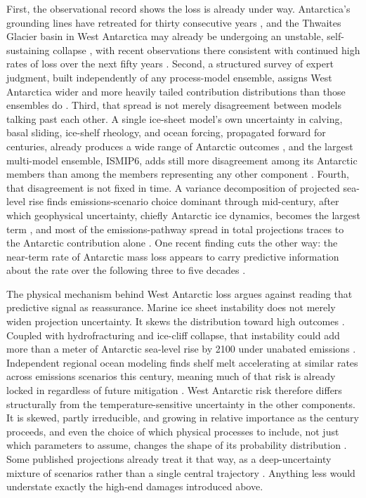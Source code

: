 \documentclass[12pt]{article}
\begin{document}
First, the observational record shows the loss is already under way.
Antarctica's grounding lines have retreated for thirty consecutive years
\citep{Rignot2026}, and the Thwaites Glacier basin in West Antarctica
may already be undergoing an unstable, self-sustaining collapse
\citep{Joughin2014}, with recent observations there consistent with
continued high rates of loss over the next fifty years
\citep{Goldberg2026}. Second, a structured survey of expert judgment,
built independently of any process-model ensemble, assigns West
Antarctica wider and more heavily tailed contribution distributions than
those ensembles do \citep{Bamber2019}. Third, that spread is not merely
disagreement between models talking past each other. A single ice-sheet
model's own uncertainty in calving, basal sliding, ice-shelf rheology,
and ocean forcing, propagated forward for centuries, already produces a
wide range of Antarctic outcomes \citep{Bulthuis2019}, and the largest
multi-model ensemble, ISMIP6, adds still more disagreement among its
Antarctic members than among the members representing any other
component \citep{Seroussi2020}. Fourth, that disagreement is not fixed
in time. A variance decomposition of projected sea-level rise finds
emissions-scenario choice dominant through mid-century, after which
geophysical uncertainty, chiefly Antarctic ice dynamics, becomes the
largest term \citep{Darnell2025}, and most of the emissions-pathway
spread in total projections traces to the Antarctic contribution alone
\citep{DeConto2021}. One recent finding cuts the other way: the
near-term rate of Antarctic mass loss appears to carry predictive
information about the rate over the following three to five decades
\citep{McCormack2026}.

The physical mechanism behind West Antarctic loss argues against
reading that predictive signal as reassurance. Marine ice sheet
instability does not merely widen projection uncertainty. It skews the
distribution toward high outcomes \citep{Robel2019}. Coupled with
hydrofracturing and ice-cliff collapse, that instability could add more
than a meter of Antarctic sea-level rise by 2100 under unabated
emissions \citep{DeContoP2016}. Independent regional ocean modeling
finds shelf melt accelerating at similar rates across emissions
scenarios this century, meaning much of that risk is already locked in
regardless of future mitigation \citep{Naughten2023}. West Antarctic
risk therefore differs structurally from the temperature-sensitive
uncertainty in the other components. It is skewed, partly irreducible,
and growing in relative importance as the century proceeds, and even
the choice of which physical processes to include, not just which
parameters to assume, changes the shape of its probability distribution
\citep{Kopp2017}. Some published projections already treat it that way,
as a deep-uncertainty mixture of scenarios rather than a single central
trajectory \citep{Bakker2017}. Anything less would understate exactly
the high-end damages introduced above.
\end{document}
